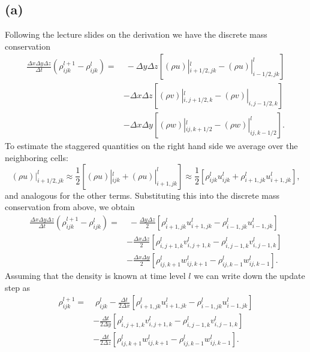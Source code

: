 \subsection*{(a)}
Following the lecture slides on the derivation we have the discrete mass conservation
\begin{align*}
\frac{\Delta x \Delta y \Delta z}{\Delta t} (\rho^{l + 1}_{ijk} - \rho^l_{ijk}) = & \; - \Delta y \Delta z\left[ (\rho u)|^l_{i + 1/2, jk} - (\rho u)|^l_{i - 1/2,jk} \right] \\
& - \Delta x \Delta z \left[ (\rho v)|_{i, j + 1/2, k}^l - (\rho v)|_{i, j - 1/2, k} \right] \\
& - \Delta x \Delta y \left[ (\rho w)|_{ij, k + 1/2}^l - (\rho w)|^l_{ij, k - 1/2} \right].
\end{align*}
To estimate the staggered quantities on the right hand side we average over the neighboring cells:
\[
(\rho u)|^l_{i + 1/2, jk} \approx \frac{1}{2} \left[( \rho u)|_{ijk}^l + (\rho u)|^l_{i + 1, jk} \right] \approx \frac{1}{2} \left[ \rho_{ijk}^l u_{ijk}^l + \rho^l_{i + 1, jk} u^l_{i + 1, jk} \right],
\]
and analogous for the other terms. Substituting this into the discrete mass conservation from above, we obtain
\begin{align*}
\frac{\Delta x \Delta y \Delta z}{\Delta t} (\rho^{l + 1}_{ijk} - \rho^l_{ijk}) = & \; - \frac{\Delta y \Delta z}{2}\left[ \rho^l_{i + 1, jk} u^l_{i + 1, jk} -  \rho^l_{i - 1, jk} u^l_{i - 1, jk} \right] \\
& - \frac{\Delta x \Delta z}{2} \left[ \rho^l_{i, j + 1,k} v^l_{i, j + 1, k} -  \rho^l_{i, j - 1, k} v^l_{i, j - 1, k} \right] \\
& - \frac{\Delta x \Delta y}{2} \left[ \rho^l_{ij, k + 1} w^l_{ij, k + 1} -  \rho^l_{ij, k - 1} w^l_{ij, k - 1} \right].
\end{align*}
Assuming that the density is known at time level $l$ we can write down the update step as
\begin{align*}
\rho^{l + 1}_{ijk} = & \; \rho^l_{ijk} - \frac{\Delta t}{2\Delta x}\left[ \rho^l_{i + 1, jk} u^l_{i + 1, jk} -  \rho^l_{i - 1, jk} u^l_{i - 1, jk} \right] \\
& - \frac{\Delta t}{2\Delta y} \left[ \rho^l_{i, j + 1,k} v^l_{i, j + 1, k} -  \rho^l_{i, j - 1, k} v^l_{i, j - 1, k} \right] \\
& - \frac{\Delta t}{2 \Delta z} \left[ \rho^l_{ij, k + 1} w^l_{ij, k + 1} -  \rho^l_{ij, k - 1} w^l_{ij, k - 1} \right].
\end{align*}

